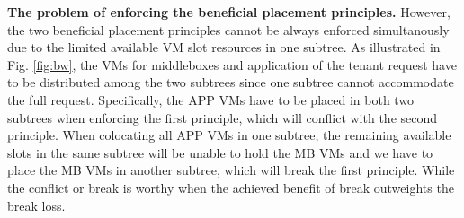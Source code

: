\documentclass[review]{elsarticle}
\begin{document}
\textbf{The problem of enforcing the beneficial placement principles.} However, the two beneficial placement principles cannot be always enforced simultanously due to the limited available VM slot resources in one subtree. As illustrated in Fig. \ref{fig:bw}, the VMs for middleboxes and application of the tenant request have to be distributed among the two subtrees since one subtree cannot accommodate the full request. Specifically, the APP VMs have to be placed in both two subtrees when enforcing the first principle, which will conflict with the second principle. When colocating all APP VMs in one subtree, the remaining available slots in the same subtree will be unable to hold the MB VMs and we have to place the MB VMs in another subtree, which will break the first principle. While the conflict or break is worthy when the achieved benefit of break outweights the break loss.
\end{document}
